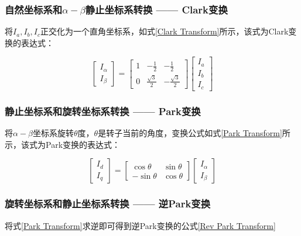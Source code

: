 \documentclass[main.tex]{subfiles}
\begin{document}
\subsubsection{自然坐标系和$\alpha-\beta$静止坐标系转换 —— Clark变换}

将$I_a,I_b, I_c$正交化为一个直角坐标系，如式\ref{Clark Transform}所示，该式为Clark变换的表达式：

\begin{equation}
\begin{bmatrix}
	I_\alpha\\
	I_\beta
\end{bmatrix}
=
\begin{bmatrix}
	1 & -\frac{1}{2} & -\frac{1}{2}\\
	0 & \frac{\sqrt{3}}{2} & -\frac{\sqrt{3}}{2}
\end{bmatrix}
\begin{bmatrix}
	I_a\\
	I_b\\
	I_c
\end{bmatrix}
\label{Clark Transform}
\end{equation}

\subsubsection{静止坐标系和旋转坐标系转换 —— Park变换}

将$\alpha-\beta$坐标系旋转$\theta$度，$\theta$是转子当前的角度，变换公式如式\ref{Park Transform}所示，该式为Park变换的表达式：

\begin{equation}
\begin{bmatrix}
	I_d\\
	I_q
\end{bmatrix}
=
\begin{bmatrix}
	\cos\theta & \sin\theta \\
	-\sin\theta & \cos\theta
\end{bmatrix}
\begin{bmatrix}
	I_\alpha\\
	I_\beta
\end{bmatrix}
\label{Park Transform}
\end{equation}

\subsubsection{旋转坐标系和静止坐标系转换 —— 逆Park变换}
将式\ref{Park Transform}求逆即可得到逆Park变换的公式\ref{Rev Park Transform}
\end{document}
